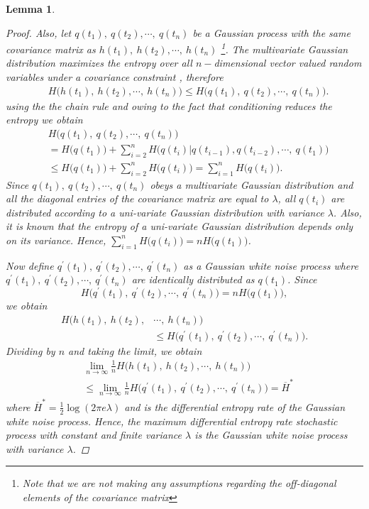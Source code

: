 \documentclass{article}
\newtheorem{lem}{Lemma}
\begin{document}
\begin{lem}
\begin{proof}
Also, let $q(t_1),\ q(t_2), \cdots, \ q(t_n)$ be a Gaussian process
with the same covariance matrix as $h(t_1),\ h(t_2), \cdots, \
h(t_n)$ \footnote{Note that we are not making any assumptions
regarding the off-diagonal elements of the covariance matrix}. The
multivariate Gaussian distribution maximizes the entropy over all
$n-$dimensional  vector valued random variables under a covariance
constraint \cite{Cover}, therefore
\begin{align*}
&H\big(h(t_1),\ h(t_2), \cdots, \ h(t_n)\big)\le H\big(q(t_1),\ q(t_2), \cdots, \ q(t_n)\big).
\end{align*}
using the  the chain rule and owing to the fact that conditioning reduces the entropy we obtain
\begin{align}
&H\big(q(t_1),\ q(t_2), \cdots, \ q(t_n)\big)\nonumber\\
&=H\big(q(t_1)\big)+\sum_{i=2}^n{H\big(q(t_i)| q(t_{i-1}), q(t_{i-2}), \cdots, \ q(t_1)\big)}\nonumber\\
&\le H\big(q(t_1)\big)+\sum_{i=2}^n{H\big(q(t_i)\big)}=\sum_{i=1}^n{H\big(q(t_i)\big)}.
\end{align}
Since $q(t_1),\ q(t_2), \cdots, \ q(t_n)$ obeys a multivariate Gaussian distribution and all the diagonal entries  of the covariance matrix are equal to $\lambda$, all $q(t_i)$ are distributed according to a uni-variate Gaussian distribution with variance $\lambda$. Also, it is known that the entropy of a uni-variate Gaussian distribution depends only on its variance.  Hence, $\sum_{i=1}^n{H\big(q(t_i)\big)}=n{H\big(q(t_1)\big)}$.

Now define $q^\prime(t_1),\ q^\prime(t_2), \cdots, \ q^\prime(t_n)$ as a Gaussian white noise process where $q^\prime(t_1),\ q^\prime(t_2), \cdots, \ q^\prime(t_n)$ are identically distributed as $q(t_1)$. Since
\begin{equation}
H\big(q^\prime(t_1),\ q^\prime(t_2), \cdots, \ q^\prime(t_n)\big)=n H\big(q(t_1)\big),
\end{equation}
we obtain
\begin{align}
H\big(h(t_1),\ h(t_2), &\cdots, \ h(t_n)\big)\nonumber\\
&\le H\big(q^\prime(t_1),\ q^\prime(t_2), \cdots, \ q^\prime(t_n)\big).
\end{align}
Dividing by $n$ and taking the limit, we obtain
\begin{align}
&\lim_{n\rightarrow\infty}\frac{1}{n}H\big(h(t_1),\ h(t_2), \cdots, \ h(t_n)\big)\nonumber\\
&\le\lim_{n\rightarrow\infty}\frac{1}{n} H\big(q^\prime(t_1),\ q^\prime(t_2), \cdots, \
q^\prime(t_n)\big)=\overline{H}^*
\end{align}
where $\overline{H}^*=\frac{1}{2}\log( 2 \pi e \lambda)$ and is the differential entropy rate of the
Gaussian white noise process. Hence, the maximum differential
entropy rate stochastic process with constant and finite variance
$\lambda$ is the Gaussian white noise process with variance
$\lambda$.
\end{proof}
\end{lem}
\end{document}
